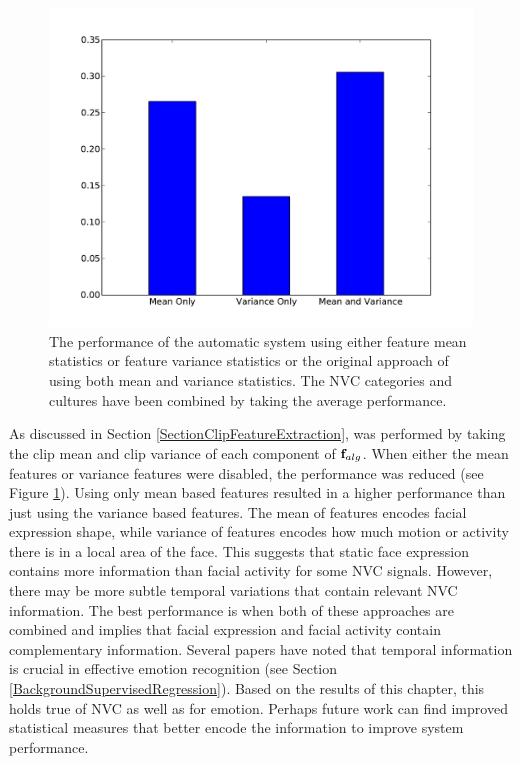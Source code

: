 \begin{figure}
\centering
\includegraphics[width = 0.85 \columnwidth]{nvcregression/PlotMeanOrVarianceOnlyFig.pdf}
\caption[The performance of the automatic system using either feature mean statistics or feature variance statistics or the original approach of using both mean and variance statistics.]{The performance of the automatic system using either feature mean statistics or feature variance statistics or the original approach of using both mean and variance statistics. The \ac{NVC} categories and cultures have been combined by taking the average performance.}
\label{FigureMeanOrVarianceCompared}
\end{figure}

As discussed in Section \ref{SectionClipFeatureExtraction}, \featureGeneration was performed by taking the clip mean and clip variance of each component of $\textbf{f}_{alg}$. When either the mean features or variance features were disabled, the performance was reduced (see Figure \ref{FigureMeanOrVarianceCompared}). Using only mean based features resulted in a higher performance than just using the variance based features. The mean of features encodes facial expression shape, while variance of features encodes how much motion or activity there is in a local area of the face. This suggests that static face expression contains more information than facial activity for some \ac{NVC} signals. However, there may be more subtle temporal variations that contain relevant \ac{NVC} information. The best performance is when both of these approaches are combined and implies that facial expression and facial activity contain complementary information. Several papers have noted that temporal information is crucial in effective emotion recognition (see Section \ref{BackgroundSupervisedRegression}). Based on the results of this chapter, this holds true of \ac{NVC} as well as for emotion. Perhaps future work can find improved statistical measures that better encode the information to improve system performance.

